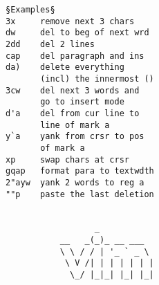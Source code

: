 \documentclass{article}
\begin{document}
\begin{multicols}{4}
\begin{lstlisting}
§Examples§
3x     remove next 3 chars
dw     del to beg of next wrd
2dd    del 2 lines
cap    del paragraph and ins
da)    delete everything
       (incl) the innermost ()
3cw    del next 3 words and
       go to insert mode
d'a    del from cur line to
       line of mark a
y`a    yank from crsr to pos
       of mark a
xp     swap chars at crsr
gqap   format para to textwdth
2"ayw  yank 2 words to reg a
""p    paste the last deletion


                  _
           __   _(_)_ __ ___
           \ \ / / | '_ ` _ \
            \ V /| | | | | | |
             \_/ |_|_| |_| |_|
\end{lstlisting}
\end{multicols}
\end{document}
